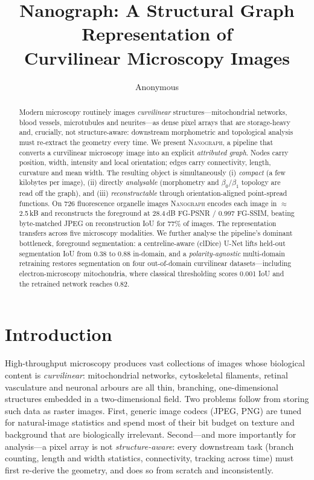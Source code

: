 \documentclass[runningheads]{llncs}
\title{Nanograph: A Structural Graph Representation of\\ Curvilinear Microscopy Images}
\author{Anonymous}
\institute{Anonymous Institution}
\newcommand{\method}{\textsc{Nanograph}\xspace}
\begin{document}
\maketitle

\begin{abstract}
Modern microscopy routinely images \emph{curvilinear} structures---mitochondrial
networks, blood vessels, microtubules and neurites---as dense pixel arrays that
are storage-heavy and, crucially, not structure-aware: downstream morphometric
and topological analysis must re-extract the geometry every time. We present
\method, a pipeline that converts a curvilinear microscopy image into an explicit
\emph{attributed graph}. Nodes carry position, width, intensity and local
orientation; edges carry connectivity, length, curvature and mean width. The
resulting object is simultaneously (i) \emph{compact} (a few kilobytes per
image), (ii) directly \emph{analysable} (morphometry and $\beta_0/\beta_1$
topology are read off the graph), and (iii) \emph{reconstructable} through
orientation-aligned point-spread functions. On 726 fluorescence organelle
images \method encodes each image in $\approx$\,2.5\,kB and reconstructs the
foreground at 28.4\,dB FG-PSNR / 0.997 FG-SSIM, beating byte-matched JPEG on
reconstruction IoU for 77\% of images. The representation transfers across five
microscopy modalities. We further analyse the pipeline's dominant bottleneck,
foreground segmentation: a centreline-aware (clDice) U-Net lifts held-out
segmentation IoU from 0.38 to 0.88 in-domain, and a \emph{polarity-agnostic}
multi-domain retraining restores segmentation on four out-of-domain curvilinear
datasets---including electron-microscopy mitochondria, where classical
thresholding scores 0.001 IoU and the retrained network reaches 0.82.
\end{abstract}

\section{Introduction}
High-throughput microscopy produces vast collections of images whose biological
content is \emph{curvilinear}: mitochondrial networks, cytoskeletal filaments,
retinal vasculature and neuronal arbours are all thin, branching, one-dimensional
structures embedded in a two-dimensional field. Two problems follow from storing
such data as raster images. First, generic image codecs (JPEG, PNG) are tuned for
natural-image statistics and spend most of their bit budget on texture and
background that are biologically irrelevant. Second---and more importantly for
analysis---a pixel array is not \emph{structure-aware}: every downstream task
(branch counting, length and width statistics, connectivity, tracking across
time) must first re-derive the geometry, and does so from scratch and
inconsistently.
\end{document}
